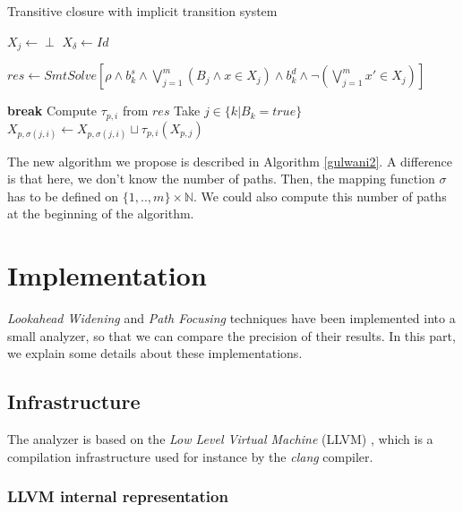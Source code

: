 \documentclass[a4paper,english,titlepage,11pt]{report}
\def\N{\mathbb{N}}
\begin{document}
\begin{algorithm}[!h]
\caption{Transitive closure with implicit transition system}\label{gulwani2}
\begin{algorithmic}[1] 
	\State $X_{j} \gets \perp$
\EndFor
\State $X_{\delta} \gets Id$

		\State $res \gets SmtSolve\left[\rho \wedge b_k^s \wedge
		\bigvee_{j=1}^m (B_j \wedge x \in X_{j})
		\wedge b_k^d
		\wedge \neg \left(\bigvee_{j=1}^m x' \in X_{j}\right)\right]$

		\State \textbf{break}
	\EndIf
	\State Compute $\tau_{p,i}$ from $res$ 
	\State Take $j \in \{ k | B_k = true\}$ 
	\State $X_{p,\sigma(j,i)} \gets X_{p,\sigma(j,i)} \sqcup
	\tau_{p,i}(X_{p,j})$
\EndWhile
\EndProcedure
\end{algorithmic}
\end{algorithm}

The new algorithm we propose is described in Algorithm \ref{gulwani2}.
A difference is that here, we don't know the number of paths. Then, the mapping
function $\sigma$ has to be defined on $\{1,..,m\} \times \N$. We could also
compute this number of paths at the beginning of the algorithm.

\FloatBarrier
\chapter{Implementation}\label{implementationpart}

\emph{Lookahead Widening} and \emph{Path Focusing}
techniques have been implemented into a small analyzer, so that we can compare
the precision of their results. In this part, we explain some details about
these implementations.

 \section{Infrastructure}
The analyzer is based on the \emph{Low Level Virtual Machine} (LLVM)
\cite{LLVM:CGO04}, which is a compilation infrastructure used for instance by
the \emph{clang} compiler.

\subsection{LLVM internal representation}
\end{document}
